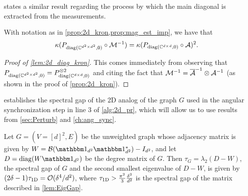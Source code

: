 states a similar result regarding the process by which the main diagonal is extracted from the measurements.
\begin{lemma} \label{lem:2d_diag_kron}
  With notation as in \cref{prop:2d_kron,prop:mag_est_imp}, we have that \[\kappa(P_{\operatorname{diag}(\mathbb{C}^{d^2 \times d^2}, 0)} \circ \mathcal{M}^{-1}) = \kappa(P_{\operatorname{diag}(\mathbb{C}^{d \times d}, 0)} \circ \mathcal{A})^2.\]
\end{lemma}
\begin{proof}[Proof of \cref{lem:2d_diag_kron}]
  This comes immediately from observing that $P_{\operatorname{diag}(\mathbb{C}^{d^2 \times d^2}, 0)} = P_{\operatorname{diag}(\mathbb{C}^{d \times d}, 0)}^{\otimes 2}$ and citing the fact that $\mathcal{M}^{-1} = \overline{\mathcal{A}}^{-1} \otimes \mathcal{A}^{-1}$ (as shown in the proof of \cref{prop:2d_kron}).
\end{proof}

 establishes the spectral gap of the 2D analog of the graph $G$ used in the angular synchronization step in line 3 of \cref{alg:2d_pr}, which will allow us to use results from \cref{sec:Perturb} and \cref{ch:ang_sync}.
\begin{proposition}
  Let $G = (V = [d]^2, E)$ be the unweighted graph whose adjacency matrix is given by $W = \B(\one_{d^2} \one_{d^2}^*) - I_{d^2}$, and let $D = \diag(W \one_{d^2})$ be the degree matrix of $G$.  Then $\tau_G = \lambda_2(D - W)$, the spectral gap of $G$ and the second smallest eigenvalue of $D - W$, is given by $(2 \delta - 1) \tau_{\rm 1D} = \mathcal{O}(\delta^4 / d^2)$, where $\tau_{\rm 1D} > \frac{\pi^2}{3}\frac{\delta^3}{d^2}$ is the spectral gap of the matrix described in \cref{lem:EigGap}.
  \label{prop:2d_specgap}
\end{proposition}

